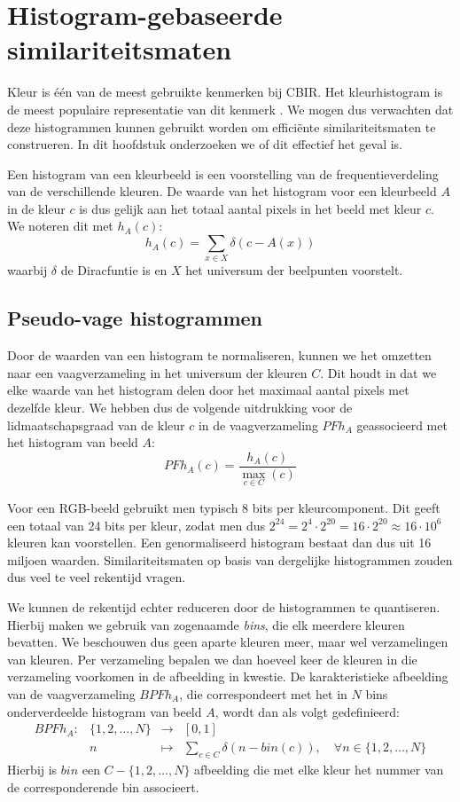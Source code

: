 \chapter{Histogram-gebaseerde similariteitsmaten}

Kleur is \'e\'en van de meest gebruikte kenmerken bij CBIR. Het kleurhistogram is de meest 
populaire representatie van dit kenmerk \cite{rui:image_retr}. We mogen dus verwachten
dat deze histogrammen kunnen gebruikt worden om effici\"ente similariteitsmaten te construeren.
In dit hoofdstuk onderzoeken we of dit effectief het geval is. 

Een histogram van een kleurbeeld is een voorstelling van de frequentieverdeling van de
verschillende kleuren. De waarde van het histogram voor een kleurbeeld $A$ in de kleur $c$ is
dus gelijk aan het totaal aantal pixels in het beeld met kleur $c$. We noteren dit met $h_A(c)$:
$$
h_A(c) = \sum_{x \in X} \delta (c - A(x))
$$
waarbij $\delta$ de Diracfuntie is en $X$ het universum der beelpunten voorstelt. 


\section{Pseudo-vage histogrammen}

Door de waarden van een histogram te normaliseren, kunnen we het omzetten naar een 
vaagverzameling in het universum der kleuren $C$. Dit houdt in dat we elke
waarde van het histogram delen door het maximaal aantal pixels met dezelfde kleur. 
We hebben dus de volgende uitdrukking voor de lidmaatschapsgraad van de kleur $c$ in de 
vaagverzameling $\mathit{PFh}_A$ geassocieerd met het histogram van beeld $A$:
$$
\mathit{PFh}_A(c) = \frac{\displaystyle h_A(c)}{\displaystyle \max_{c \in C}(c)}
$$

Voor een RGB-beeld gebruikt men typisch 8 bits per kleurcomponent. Dit geeft een totaal van
24 bits per kleur, zodat men dus $2^{24}=2^4 \cdot 2^{20}=16 \cdot 2^{20} \approx 16 \cdot 10^6$
kleuren kan voorstellen. Een genormaliseerd histogram bestaat dan dus uit 16 miljoen waarden.
Similariteitsmaten op basis van dergelijke histogrammen zouden dus veel te veel rekentijd vragen.

We kunnen de rekentijd echter reduceren door de histogrammen te quantiseren. Hierbij
maken we gebruik van zogenaamde \emph{bins}, die elk meerdere kleuren bevatten. We beschouwen dus 
geen aparte kleuren meer, maar wel verzamelingen van kleuren. Per verzameling bepalen we dan 
hoeveel keer de kleuren in die verzameling voorkomen 
in de afbeelding in kwestie. De karakteristieke afbeelding van de vaagverzameling $\mathit{BPFh}_A$, die
correspondeert met het in $N$ bins onderverdeelde histogram van beeld $A$, wordt dan als volgt
gedefinieerd:  
$$
\begin{array}{lrcl}
\mathit{BPFh}_A: 	& \{1,2,\ldots,N\} 	& \to 		& [0,1] \\[5pt]
		& n						& \mapsto	& \displaystyle\sum_{c \in C} \delta (n -  bin(c)),
\quad\forall n \in \{1,2,\ldots,N\}
\end{array}
$$
Hierbij is $bin$ een $C - \{1,2,\ldots,N\}$ afbeelding die met elke kleur het nummer van de 
corresponderende bin associeert. 

